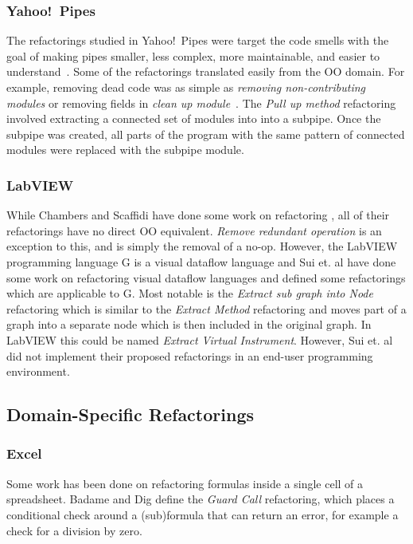 \documentclass[10pt,conference,compsocconf]{IEEEtran}
\begin{document}
\subsubsection{Yahoo!\ Pipes}
The refactorings studied in Yahoo!\ Pipes were target the code smells with the goal of making pipes smaller, less complex, more maintainable, and easier to understand~\cite{StoleeTSE2013}. Some of the refactorings translated easily from the OO domain. For example, removing dead code was as simple as \emph{removing non-contributing modules} or removing fields in \emph{clean up module}~\cite{StoleeTSE2013}. The \emph{Pull up method} refactoring involved extracting a connected set of modules into into a subpipe. Once the subpipe was created, all  parts of the program with the same pattern of connected modules were replaced with the subpipe module. 

\subsubsection{LabVIEW}

While Chambers and Scaffidi have done some work on refactoring \cite{chambers2015impact}, all of their refactorings have no direct OO equivalent. \emph{Remove redundant operation} is an exception to this, and is simply the removal of a no-op.
However, the LabVIEW programming language G is a visual dataflow language and
Sui et. al \cite{sui2008automated} have done some work on refactoring visual dataflow languages and defined some refactorings which are applicable to G.
Most notable is the \textit{Extract sub graph into Node} refactoring which is similar to the \textit{Extract Method} refactoring and moves part of a graph into a separate node which is then included in the original graph.
In LabVIEW this could be named \textit{Extract Virtual Instrument}.
However, Sui et. al did not implement their proposed refactorings in an end-user programming environment.

\subsection{Domain-Specific Refactorings}

\subsubsection{Excel}

Some work has been done on refactoring formulas inside a single cell of a spreadsheet. Badame and Dig \cite{badame2012refactoring} define the \textit{Guard Call} refactoring, which places a conditional check around a (sub)formula that can return an error, for example a check for a division by zero.
\end{document}
